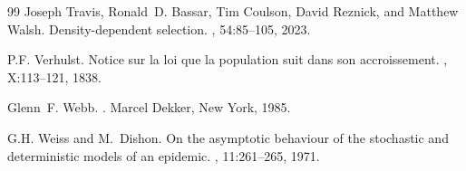 \documentclass[12pt]{article}
\begin{document}
\begin{thebibliography}{99}
Joseph Travis, Ronald~D. Bassar, Tim Coulson, David Reznick, and Matthew Walsh.
\newblock Density-dependent selection.
,
  54:85--105, 2023.

P.F. Verhulst.
\newblock Notice sur la loi que la population suit dans son accroissement.
, X:113--121, 1838.

Glenn~F. Webb.
.
\newblock Marcel Dekker, New York, 1985.

G.H. Weiss and M.~Dishon.
\newblock On the asymptotic behaviour of the stochastic and deterministic
  models of an epidemic.
, 11:261--265, 1971.

\end{thebibliography}
\end{document}
